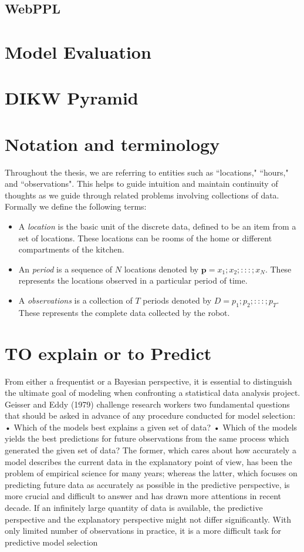 \documentclass[11pt]{report}
\begin{document}
\subsection{WebPPL}

\section{Model Evaluation}

\section{DIKW Pyramid }

\section{Notation and terminology}
Throughout the thesis, we are referring to entities such as ``locations," ``hours," and ``observations".
This helps to guide intuition and maintain continuity of thoughts as we guide through related problems involving collections of data.
Formally we define the following terms:
\begin{itemize}
	\item A \emph{location} is the basic unit of the discrete data, defined to be an item from a set of locations. These locations can be rooms of the home or different compartments of the kitchen. 
	\item An \emph{period} is a sequence of $N$ locations denoted by $\textbf{p} = {x_1;x_2;:::;x_N}$. These represents the locations observed in a particular period of time.
	\item A \emph{observations} is a collection of $T$ periods denoted by $ D = {p_1;p_2;:::;p_T}$. These represents the complete data collected by the robot.
\end{itemize}

\section{TO explain or to Predict}

From either a frequentist or a Bayesian perspective, it is essential to distinguish the
ultimate goal of modeling when confronting a statistical data analysis project. Geisser
and Eddy (1979) challenge research workers two fundamental questions that should
be asked in advance of any procedure conducted for model selection:
• Which of the models best explains a given set of data?
• Which of the models yields the best predictions for future observations from
the same process which generated the given set of data?
The former, which cares about how accurately a model describes the current data in
the explanatory point of view, has been the problem of empirical science for many
years; whereas the latter, which focuses on predicting future data as accurately as
possible in the predictive perspective, is more crucial and difficult to answer and has
drawn more attentions in recent decade.
If an infinitely large quantity of data is available, the predictive perspective and
the explanatory perspective might not differ significantly. With only limited number
of observations in practice, it is a more difficult task for predictive model selection
\end{document}
